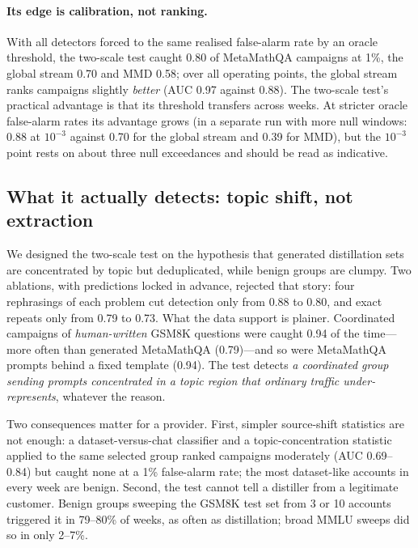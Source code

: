 \paragraph{Its edge is calibration, not ranking.} With all detectors forced to the same realised false-alarm rate by an oracle threshold, the two-scale test caught 0.80 of MetaMathQA campaigns at 1\%, the global stream 0.70 and MMD 0.58; over all operating points, the global stream ranks campaigns slightly \emph{better} (AUC 0.97 against 0.88). The two-scale test's practical advantage is that its threshold transfers across weeks. At stricter oracle false-alarm rates its advantage grows (in a separate run with more null windows: 0.88 at $10^{-3}$ against 0.70 for the global stream and 0.39 for MMD), but the $10^{-3}$ point rests on about three null exceedances and should be read as indicative.

\subsection{What it actually detects: topic shift, not extraction}
\label{sec:mechanism-full}

We designed the two-scale test on the hypothesis that generated distillation sets are concentrated by topic but deduplicated, while benign groups are clumpy. Two ablations, with predictions locked in advance, rejected that story: four rephrasings of each problem cut detection only from 0.88 to 0.80, and exact repeats only from 0.79 to 0.73. What the data support is plainer. Coordinated campaigns of \emph{human-written} GSM8K questions were caught 0.94 of the time---more often than generated MetaMathQA (0.79)---and so were MetaMathQA prompts behind a fixed template (0.94). The test detects \emph{a coordinated group sending prompts concentrated in a topic region that ordinary traffic under-represents}, whatever the reason.

Two consequences matter for a provider. First, simpler source-shift statistics are not enough: a dataset-versus-chat classifier and a topic-concentration statistic applied to the same selected group ranked campaigns moderately (AUC 0.69--0.84) but caught none at a 1\% false-alarm rate; the most dataset-like accounts in every week are benign. Second, the test cannot tell a distiller from a legitimate customer. Benign groups sweeping the GSM8K test set from 3 or 10 accounts triggered it in 79--80\% of weeks, as often as distillation; broad MMLU sweeps did so in only 2--7\%.


